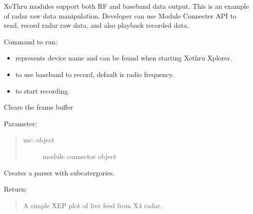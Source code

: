 \documentclass[letterpaper,10pt,english]{sphinxmanual}
\begin{document}
XeThru modules support both RF and baseband data output. This is an example of radar raw data manipulation.
Developer can use Module Connecter API to read, record radar raw data, and also playback recorded data.

Command to run: 
\begin{itemize}
\item {} 
 represents device name and can be found when starting Xethru Xplorer.

\item {} 
 to use baseband to record, default is radio frequency.

\item {} 
 to start recording.

\end{itemize}
\label{\detokenize{X4 radar:module-X4_record_playback}}

\begin{fulllineitems}
\label{\detokenize{X4 radar:X4_record_playback.clear_buffer}}
Clears the frame buffer

Parameter:
\begin{quote}
\begin{description}
\item[{mc: object}] \leavevmode
module connector object

\end{description}
\end{quote}

\end{fulllineitems}


\begin{fulllineitems}
\label{\detokenize{X4 radar:X4_record_playback.main}}
Creates a parser with subcatergories.

Return:
\begin{quote}

A simple XEP plot of live feed from X4 radar.
\end{quote}

\end{fulllineitems}
\end{document}
